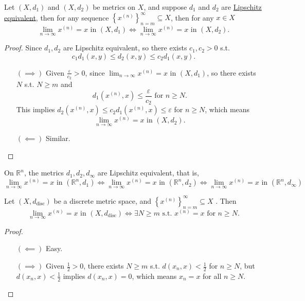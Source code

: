 \begin{theorem}\label{thm: Lipschitz eq implies converge at same place}
    Let \((X, d_1)\) and \((X, d_2)\) be metrics on \(X\), and suppose \(d_1\) and \(d_2\) are \hyperref[def: Lipschitz equivalent metric]{Lipschitz equivalent}, then for any sequence \(\left\{ x^{(n)} \right\}_{n=m}^{\infty} \subseteq X \), then for any \(x \in X\)
    \[
        \lim_{n \to \infty} x^{(n)} = x \text{ in } (X, d_1) \iff \lim_{n \to \infty} x^{(n)} = x \text{ in } (X, d_2). 
    \]        
\end{theorem}
\begin{proof}
    Since \(d_1, d_2\) are Lipschitz equivalent, so there exists \(c_1, c_2 > 0\) s.t. 
    \[
        c_1 d_1(x,y) \le d_2(x, y) \le c_2 d_1(x, y).
    \]  
    \begin{itemize}
        \item [\((\implies )\)] Given \(\frac{\varepsilon}{c_2} > 0\), since \(\lim_{n \to \infty} x^{(n)} = x \) in \((X, d_1)\), so there exists \(N\) s.t. \(N \ge m\) and 
        \[
            d_1(x^{(n)}, x) \le \frac{\varepsilon}{c_2} \text{ for } n \ge N.
        \]
        This implies \(d_2(x^{(n)}, x) \le c_2 d_1(x^{(n)},x) \le \varepsilon \) for \(n \ge N\), which means 
        \[
            \lim_{n \to \infty} x^{(n)} = x \text{ in } (X,d_2). 
        \]  
        \item [\((\impliedby )\) ] Similar.
    \end{itemize}
\end{proof}

\begin{remark}
    On \(\mathbb{R} ^n\), the metrics \(d_1, d_2, d_\infty \) are Lipschitz equivalent, that is, 
    \[
        \lim_{n \to \infty} x^{(n)} = x \text{ in } (\mathbb{R}^n, d_1) \iff \lim_{n \to \infty} x^{(n)} = x \text{ in } (\mathbb{R}^n, d_2) \iff \lim_{n \to \infty} x^{(n)} = x \text{ in } (\mathbb{R}^n, d_\infty )  
    \]   
\end{remark}

\begin{proposition}
    Let \((X, d_{\text{disc}})\) be a discrete metric space, and \(\left\{ x^{(n)} \right\}_{n=m}^{\infty} \subseteq X \) . Then 
    \[
        \lim_{n \to \infty} x^{(n)} = x \text{ in } (X, d_{\text{disc}}) \iff \exists N \ge m \text{ s.t. } x^{(n)}=x \text{ for } n \ge N. 
    \] 
\end{proposition}
\begin{proof}
    \begin{itemize}
        \item [\((\impliedby )\) ] Easy. 
        \item [\((\implies )\) ] Given \(\frac{1}{2} > 0\), there exists \(N \ge m\) s.t. \(d(x_n, x) < \frac{1}{2}\) for \(n \ge N\), but \(d(x_n, x) < \frac{1}{2}\) implies \(d(x_n, x) = 0\), which means \(x_n = x\) for all \(n \ge N\).       
    \end{itemize}
\end{proof}

